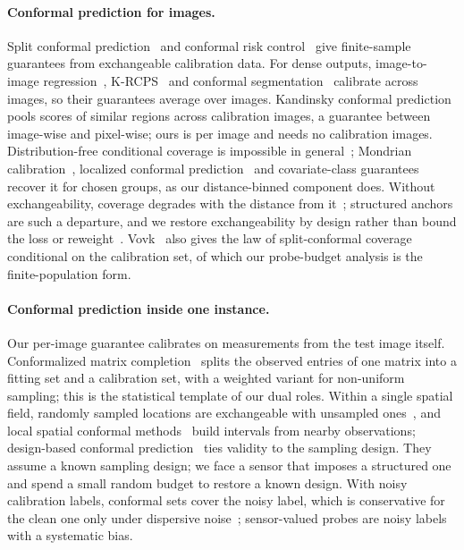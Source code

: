 \paragraph{Conformal prediction for images.}
Split conformal prediction~\cite{vovk2005alrw,lei2018distribution,angelopoulos2023gentle} and conformal risk control~\cite{angelopoulos2024crc} give finite-sample guarantees from exchangeable calibration data.
For dense outputs, image-to-image regression~\cite{angelopoulos2022im2im}, K-RCPS~\cite{teneggi2023krcps} and conformal segmentation~\cite{mossina2024segmentation} calibrate across images, so their guarantees average over images.
Kandinsky conformal prediction~\cite{brunekreef2024kandinsky,bairaktari2025kandinsky} pools scores of similar regions across calibration images, a guarantee between image-wise and pixel-wise; ours is per image and needs no calibration images.
Distribution-free conditional coverage is impossible in general~\cite{vovk2012conditional,barber2021limits}; Mondrian calibration~\cite{vovk2005alrw}, localized conformal prediction~\cite{guan2023localized} and covariate-class guarantees~\cite{gibbs2023conditional} recover it for chosen groups, as our distance-binned component does.
Without exchangeability, coverage degrades with the distance from it~\cite{barber2023beyond}; structured anchors are such a departure, and we restore exchangeability by design rather than bound the loss or reweight~\cite{tibshirani2019covshift}.
Vovk~\cite{vovk2012conditional} also gives the law of split-conformal coverage conditional on the calibration set, of which our probe-budget analysis is the finite-population form.

\paragraph{Conformal prediction inside one instance.}
Our per-image guarantee calibrates on measurements from the test image itself.
Conformalized matrix completion~\cite{gui2023cmc} splits the observed entries of one matrix into a fitting set and a calibration set, with a weighted variant for non-uniform sampling; this is the statistical template of our dual roles.
Within a single spatial field, randomly sampled locations are exchangeable with unsampled ones~\cite{mao2024spatial}, and local spatial conformal methods~\cite{jiang2024lscp} build intervals from nearby observations; design-based conformal prediction~\cite{wieczorek2023design} ties validity to the sampling design.
They assume a known sampling design; we face a sensor that imposes a structured one and spend a small random budget to restore a known design.
With noisy calibration labels, conformal sets cover the noisy label, which is conservative for the clean one only under dispersive noise~\cite{einbinder2024labelnoise}; sensor-valued probes are noisy labels with a systematic bias.

